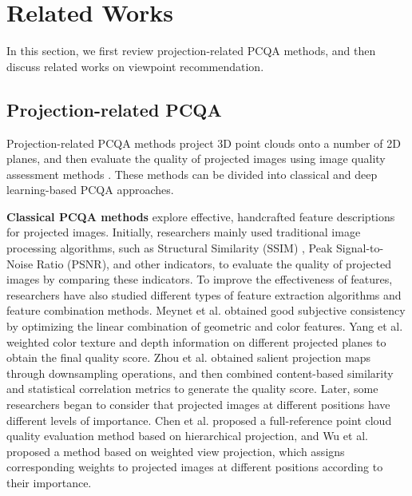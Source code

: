 \section{Related Works}
\label{sec:related_works}
In this section, we first review projection-related PCQA methods, and then discuss related works on viewpoint recommendation.

\subsection{Projection-related PCQA}
Projection-related PCQA methods project 3D point clouds onto a number of 2D planes, and then evaluate the quality of projected images using image quality assessment methods \cite{dumic2018artPCQA}. 
These methods can be divided into classical and deep learning-based PCQA approaches.

\textbf{Classical PCQA methods} explore effective, handcrafted feature descriptions for projected images.
Initially, researchers mainly used traditional image processing algorithms, such as Structural Similarity (SSIM) \cite{Tao2009RR-IQA,alex2020SSIM}, Peak Signal-to-Noise Ratio (PSNR), and other indicators, to evaluate the quality of projected images by comparing these indicators.
To improve the effectiveness of features, researchers have also studied different types of feature extraction algorithms and feature combination methods. 
Meynet et al. \cite{meynet220FR-PCQA} obtained good subjective consistency by optimizing the linear combination of geometric and color features.
Yang et al. \cite{yang82020-3d-2d} weighted color texture and depth information on different projected planes to obtain the final quality score.
Zhou et al. \cite{Zhou23rr} obtained salient projection maps through downsampling operations, and then combined content-based similarity and statistical correlation metrics to generate the quality score.
Later, some researchers began to consider that projected images at different positions have different levels of importance. 
Chen et al. \cite{chen9-2021-layer-proj} proposed a full-reference point cloud quality evaluation method based on hierarchical projection, and Wu et al. \cite{wu10-2021-6DoF} proposed a method based on weighted view projection, which assigns corresponding weights to projected images at different positions according to their importance.

